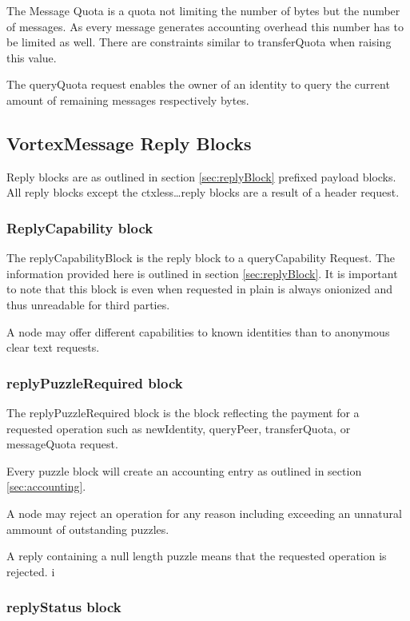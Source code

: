 The Message Quota is a quota not limiting the number of bytes but the number of messages. As every message generates accounting overhead this number has to be limited as well. There are constraints similar to transferQuota when raising this value.

The queryQuota request enables the owner of an identity to query the current amount of remaining messages respectively bytes.

\subsection{VortexMessage Reply Blocks}
Reply blocks are as outlined in section \ref{sec:replyBlock} prefixed payload blocks. All reply blocks except the ctxless\ldots reply blocks are a result of a header request.

\subsubsection{ReplyCapability block}
The replyCapabilityBlock is the reply block to a queryCapability Request. The information provided here is outlined in section \ref{sec:replyBlock}. It is important to note that this block is even when requested in plain is always onionized and thus unreadable for third parties. 

A node may offer different capabilities to known identities than to anonymous clear text requests.

\subsubsection{replyPuzzleRequired block}


The replyPuzzleRequired block is the block reflecting the payment for a requested operation such as newIdentity, queryPeer, transferQuota, or messageQuota request.

Every puzzle block will create an accounting entry as outlined in section \ref{sec:accounting}. 

A node may reject an operation for any reason including exceeding an unnatural ammount of outstanding puzzles.

A reply containing a null length puzzle means that the requested operation is rejected.
                                 i

\subsubsection{replyStatus block}

